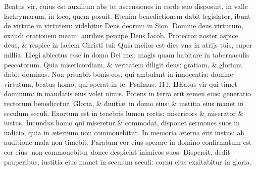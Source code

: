 \documentclass[a5paper,10pt]{book}
\def\ae{æ}
\begin{document}
\begin{multicols*}{2}
\newline \color{red} B\color{black}eatus vir, cuius est auxilium abs te: ascensiones in corde suo disposuit, in valle lachrymarum, in loco, quem posuit.
\newline \color{red} E\color{black}tenim benedictionem dabit legislator, ibunt de virtute in virtutem: videbitur Deus deorum in Sion.
\newline \color{red} D\color{black}omine deus virtutum, exaudi orationem meam: auribus percipe Deus Iacob.
\newline \color{red} P\color{black}rotector noster aspice deus, \& respice in faciem Christi tui:
\newline \color{red} Q\color{black}uia melior est dies vna in atrijs tuis, super millia.
\newline \color{red} E\color{black}legi abiectus esse in domo Dei mei: magis quam habitare in tabernaculis peccatorum.
\newline \color{red} Q\color{black}uia misericordiam, \& veritatem diligit deus: gratiam, \& gloriam dabit dominus.
\newline \color{red} N\color{black}on priuabit bonis eos, qui ambulant in innocentia: domine virtutum, beatus homo, qui sperat in te.
\newline \color{red} Psalmus. \hypertarget{ps111}{111.} \color{black}
\vspace{-.5em}
\lettrine[lines=2]{\bfseries \color{red} B}{}Eatus vir qui timet dominum: in mandatis eius volet nimis.
\newline \color{red} P\color{black}otens in terra erit semen eius: generatio rectorum benedicetur.
\newline \color{red} G\color{black}loria, \& diuiti\ae \ in domo eius: \& iustitia eius manet in seculum seculi.
\newline \color{red} E\color{black}xortum est in tenebris lumen rectis: misericors \& miserator \& iustus.
\newline \color{red} I\color{black}ucundus homo qui miseretur \& commodat, disponet sermones suos in iudicio, quia in \ae ternum non commouebitur.
\newline \color{red} I\color{black}n memoria \ae terna erit iustus: ab auditione mala non timebit.
\newline \color{red} P\color{black}aratum cor eius sperare in domino confirmatum est cor eius: non commouebitur donec despiciat inimicos suos.
\newline \color{red} D\color{black}ispersit, dedit pauperibus, iustitia eius manet in seculum seculi: cornu eius exaltabitur in gloria.

\end{multicols*}
\end{document}
